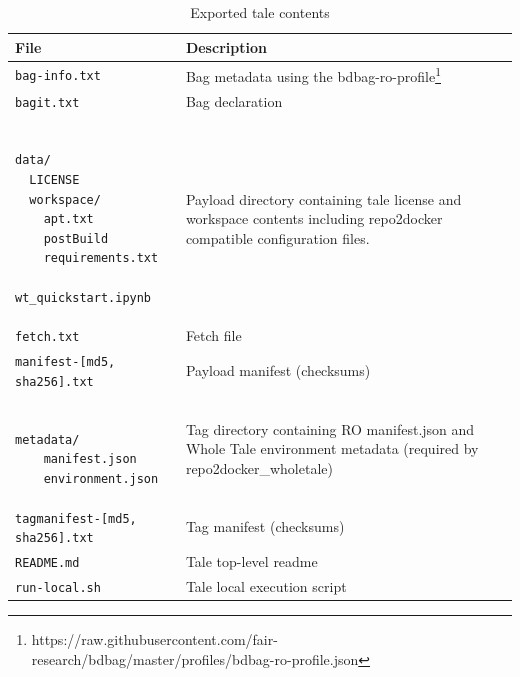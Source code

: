 \documentclass[conference]{IEEEtran}
\begin{document}
\begin{table}
\begin{center}
\begin{footnotesize}
\begin{tabular}{| p{3.5cm}|p{4.5cm} | } \hline
{\bf File} & {\bf Description}  \\ \hline
\texttt{bag-info.txt} & Bag metadata using the bdbag-ro-profile\footnote{https://raw.githubusercontent.com/fair-research/bdbag/master/profiles/bdbag-ro-profile.json} \\ \hline
\texttt{bagit.txt} & Bag declaration \\ \hline
\begin{minipage}{3in}
\begin{scriptsize}
\begin{verbatim}

data/
  LICENSE
  workspace/
    apt.txt
    postBuild
    requirements.txt
    wt_quickstart.ipynb
\end{verbatim}
\end{scriptsize}
\end{minipage} & Payload directory containing tale license and workspace contents including repo2docker compatible configuration files. \\ \hline
\texttt{\texttt{fetch.txt}} & Fetch file \\ \hline
\texttt{manifest-[md5, sha256].txt} & Payload manifest (checksums) \\ \hline
\begin{minipage}{3in}
\begin{scriptsize}
\begin{verbatim}

metadata/
    manifest.json
    environment.json
\end{verbatim}
\end{scriptsize}
\end{minipage} & Tag directory containing RO manifest.json and Whole Tale environment metadata  (required by repo2docker\_wholetale) \\ \hline
\texttt{tagmanifest-[md5, sha256].txt} & Tag manifest (checksums) \\ \hline
\texttt{README.md} & Tale top-level readme \\ \hline
\texttt{run-local.sh} & Tale local execution script \\ \hline
\end{tabular}
\end{footnotesize}
\label{bagitro-example}
\caption{Exported tale contents}
\end{center}
\end{table}
\end{document}
